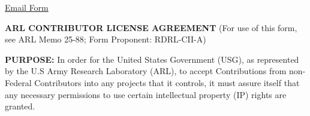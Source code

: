 \documentclass[8pt]{article}
\begin{document}
\href{mailto:usarmy.adelphi.rdecom-arl.list.usarmy-adelphi-md-rdecom-arl-list@mail.mil?subject=RE%20Contribution}{Email Form}
\begin{Form}
\begin{center}
\textbf{ARL CONTRIBUTOR LICENSE AGREEMENT} \break
(For use of this form, see ARL Memo 25-88; Form Proponent: RDRL-CII-A)
\end{center}
    \fontsize{10}{10}\selectfont
\textbf{PURPOSE:}
\break
In order for the United States Government (USG), as represented by the
U.S Army Research Laboratory (ARL), to accept Contributions from
non-Federal Contributors into any projects that it controls, it must
assure itself that any necessary permissions to use certain intellectual
property (IP) rights are granted.


\end{Form}
\end{document}
